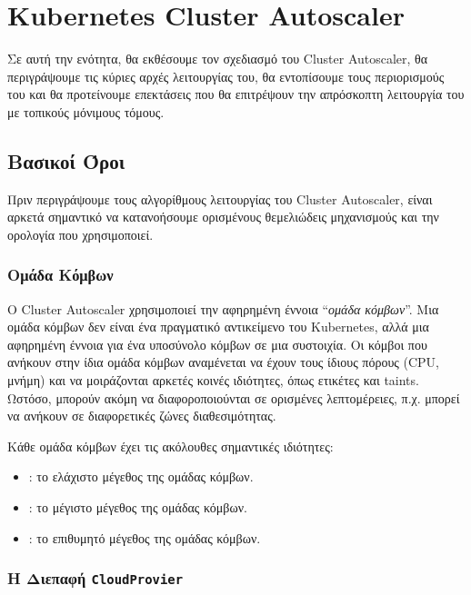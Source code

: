 \section{Kubernetes Cluster Autoscaler}
\label{section-gr:autoscaler}

Σε αυτή την ενότητα, θα εκθέσουμε τον σχεδιασμό του Cluster Autoscaler, θα
περιγράψουμε τις κύριες αρχές λειτουργίας του, θα εντοπίσουμε τους περιορισμούς
του και θα προτείνουμε επεκτάσεις που θα επιτρέψουν την απρόσκοπτη λειτουργία
του με τοπικούς μόνιμους τόμους.


\subsection{Βασικοί Όροι}

Πριν περιγράψουμε τους αλγορίθμους λειτουργίας του Cluster Autoscaler, είναι
αρκετά σημαντικό να κατανοήσουμε ορισμένους θεμελιώδεις μηχανισμούς και την
ορολογία που χρησιμοποιεί.

\subsubsection{Ομάδα Κόμβων}

Ο Cluster Autoscaler χρησιμοποιεί την αφηρημένη έννοια ``\textit{ομάδα
      κόμβων}''. Μια ομάδα κόμβων δεν είναι ένα πραγματικό αντικείμενο του
      Kubernetes, αλλά μια αφηρημένη έννοια για ένα υποσύνολο κόμβων σε μια
      συστοιχία. Οι κόμβοι που ανήκουν στην ίδια ομάδα κόμβων αναμένεται να
      έχουν τους ίδιους πόρους (CPU, μνήμη) και να μοιράζονται αρκετές κοινές
      ιδιότητες, όπως ετικέτες και taints. Ωστόσο, μπορούν ακόμη να
      διαφοροποιούνται σε ορισμένες λεπτομέρειες, π.χ. μπορεί να ανήκουν σε
      διαφορετικές ζώνες διαθεσιμότητας.

Κάθε ομάδα κόμβων έχει τις ακόλουθες σημαντικές ιδιότητες:
\begin{itemize}
      \tightlist
      \item {}: το ελάχιστο μέγεθος της ομάδας κόμβων.
      \item {}: το μέγιστο μέγεθος της ομάδας κόμβων.
      \item {}: το επιθυμητό μέγεθος της ομάδας κόμβων.
\end{itemize}

\subsubsection{Η Διεπαφή \texttt{CloudProvier}}

